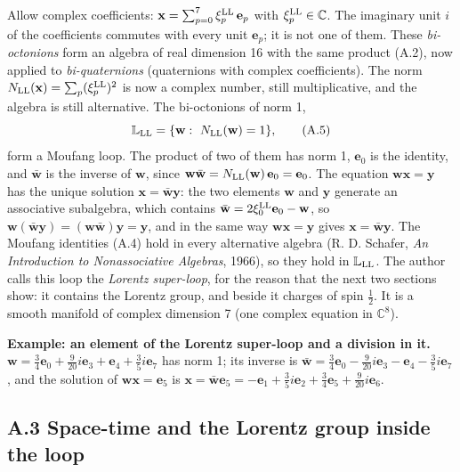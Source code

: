 \documentclass[
  10pt,
]{article}
\begin{document}
Allow complex coefficients:
\(\mathbf x=\sum_{p=0}^7\xi^{\rm LL}_p\,\mathbf e_p\) with
\(\xi^{\rm LL}_p\in\mathbb C\). The imaginary unit \(i\) of the
coefficients commutes with every unit \(\mathbf e_p\); it is not one of
them. These \emph{bi-octonions} form an algebra of real dimension 16
with the same product (A.2), now applied to \emph{bi-quaternions}
(quaternions with complex coefficients). The norm
\(N_{\rm LL}(\mathbf x)=\sum_p(\xi^{\rm LL}_p)^2\) is now a complex
number, still multiplicative, and the algebra is still alternative. The
bi-octonions of norm 1,
\[\mathbb L_{\rm LL}=\{\mathbf w:\ N_{\rm LL}(\mathbf w)=1\},\tag{A.5}\]
form a Moufang loop. The product of two of them has norm 1,
\(\mathbf e_0\) is the identity, and \(\bar{\mathbf w}\) is the inverse
of \(\mathbf w\), since
\(\mathbf w\bar{\mathbf w}=N_{\rm LL}(\mathbf w)\,\mathbf e_0=\mathbf e_0\).
The equation \(\mathbf w\mathbf x=\mathbf y\) has the unique solution
\(\mathbf x=\bar{\mathbf w}\mathbf y\): the two elements \(\mathbf w\)
and \(\mathbf y\) generate an associative subalgebra, which contains
\(\bar{\mathbf w}=2\xi^{\rm LL}_0\mathbf e_0-\mathbf w\), so
\(\mathbf w(\bar{\mathbf w}\mathbf y)=(\mathbf w\bar{\mathbf w})\mathbf y=\mathbf y\),
and in the same way \(\mathbf w\mathbf x=\mathbf y\) gives
\(\mathbf x=\bar{\mathbf w}\mathbf y\). The Moufang identities (A.4)
hold in every alternative algebra (R. D. Schafer, \emph{An Introduction
to Nonassociative Algebras}, 1966), so they hold in
\(\mathbb L_{\rm LL}\). The author calls this loop the \emph{Lorentz
super-loop}, for the reason that the next two sections show: it contains
the Lorentz group, and beside it charges of spin \(\tfrac12\). It is a
smooth manifold of complex dimension 7 (one complex equation in
\(\mathbb C^8\)).

\textbf{Example: an element of the Lorentz super-loop and a division in
it.}
\(\mathbf w=\tfrac{3}{4}\mathbf e_{0}+\tfrac{9}{20}i\mathbf e_{3}+\mathbf e_{4}+\tfrac{3}{5}i\mathbf e_{7}\)
has norm 1; its inverse is
\(\bar{\mathbf w}=\tfrac{3}{4}\mathbf e_{0}-\tfrac{9}{20}i\mathbf e_{3}-\mathbf e_{4}-\tfrac{3}{5}i\mathbf e_{7}\),
and the solution of \(\mathbf w\mathbf x=\mathbf e_5\) is
\(\mathbf x=\bar{\mathbf w}\mathbf e_5=-\mathbf e_{1}+\tfrac{3}{5}i\mathbf e_{2}+\tfrac{3}{4}\mathbf e_{5}+\tfrac{9}{20}i\mathbf e_{6}\).

\hypertarget{a.3-space-time-and-the-lorentz-group-inside-the-loop}{%
\subsection{A.3 Space-time and the Lorentz group inside the
loop}\label{a.3-space-time-and-the-lorentz-group-inside-the-loop}}
\end{document}
